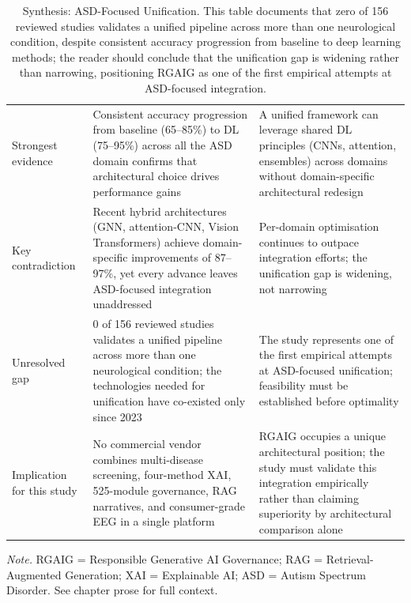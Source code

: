 {\tablestripes\tablefontsize
\begin{xltabular}{\textwidth}{@{} p{2.2cm} p{6.3cm} p{5.8cm} @{}}
\caption[Synthesis: ASD-Focused Unification]{Synthesis: ASD-Focused Unification. This table documents that zero of 156 reviewed studies validates a unified pipeline across more than one neurological condition, despite consistent accuracy progression from baseline to deep learning methods; the reader should conclude that the unification gap is widening rather than narrowing, positioning RGAIG as one of the first empirical attempts at ASD-focused integration.}\label{tab:synth_cross_domain} \\
\toprule
{} &  &  \\
\midrule
\endfirsthead
\endhead
\bottomrule
\endlastfoot
Strongest evidence & Consistent accuracy progression from baseline (65--85\%) to DL (75--95\%) across all the ASD domain confirms that architectural choice drives performance gains & A unified framework can leverage shared DL principles (CNNs, attention, ensembles) across domains without domain-specific architectural redesign \\
\addlinespace
Key contradiction & Recent hybrid architectures (GNN, attention-CNN, Vision Transformers) achieve domain-specific improvements of 87--97\%, yet every advance leaves ASD-focused integration unaddressed & Per-domain optimisation continues to outpace integration efforts; the unification gap is widening, not narrowing \\
\addlinespace
Unresolved gap & 0 of 156 reviewed studies validates a unified pipeline across more than one neurological condition; the technologies needed for unification have co-existed only since 2023 & The study represents one of the first empirical attempts at ASD-focused unification; feasibility must be established before optimality \\
\addlinespace
Implication for this study & No commercial vendor combines multi-disease screening, four-method XAI, 525-module governance, RAG narratives, and consumer-grade EEG in a single platform & RGAIG occupies a unique architectural position; the study must validate this integration empirically rather than claiming superiority by architectural comparison alone \\
\end{xltabular}}
\vspace{0.3em}\noindent\textit{Note.} RGAIG = Responsible Generative AI Governance; RAG = Retrieval-Augmented Generation; XAI = Explainable AI; ASD = Autism Spectrum Disorder. See chapter prose for full context.

